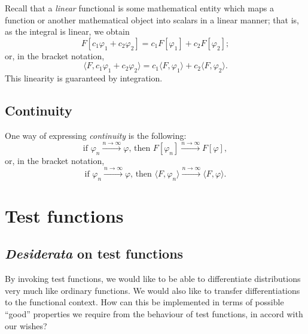 Recall that a {\em linear} functional is some mathematical entity which maps a function or another mathematical object
into scalars in a linear manner; that is, as the integral is linear, we obtain
\begin{equation}
F[c_1\varphi_1+c_2\varphi_2 ]=
c_1F[\varphi_1]  +
c_2F[\varphi_2];
\end{equation}
or, in the bracket notation,
\begin{equation}
\langle F ,   c_1\varphi_1+c_2\varphi_2 \rangle  =
c_1 \langle F ,  \varphi_1   \rangle  +
c_2 \langle F ,   \varphi_2   \rangle .
\end{equation}
This linearity is guaranteed by integration.

\subsection{Continuity}

One way of expressing {\em continuity} is
 the following:
\begin{equation}
\textrm{if }
\varphi_n \stackrel{n\rightarrow \infty}{\longrightarrow} \varphi
\textrm{, then }
F[\varphi_n ] \stackrel{n\rightarrow \infty}{\longrightarrow} F[\varphi  ],
\end{equation}
or, in the bracket notation,
\begin{equation}
\textrm{if }
\varphi_n \stackrel{n\rightarrow \infty}{\longrightarrow} \varphi
\textrm{, then }
\langle F ,    \varphi_n  \rangle \stackrel{n\rightarrow \infty}{\longrightarrow} \langle F ,    \varphi   \rangle .
\end{equation}


\section{Test functions}

\subsection{{\it Desiderata} on test functions}

By invoking test functions, we would like to be able to differentiate distributions very much like ordinary functions.
We would also like to transfer differentiations to the functional context.
How can this be implemented in terms of possible ``good'' properties we require from the behaviour of test functions, in accord with our wishes?

